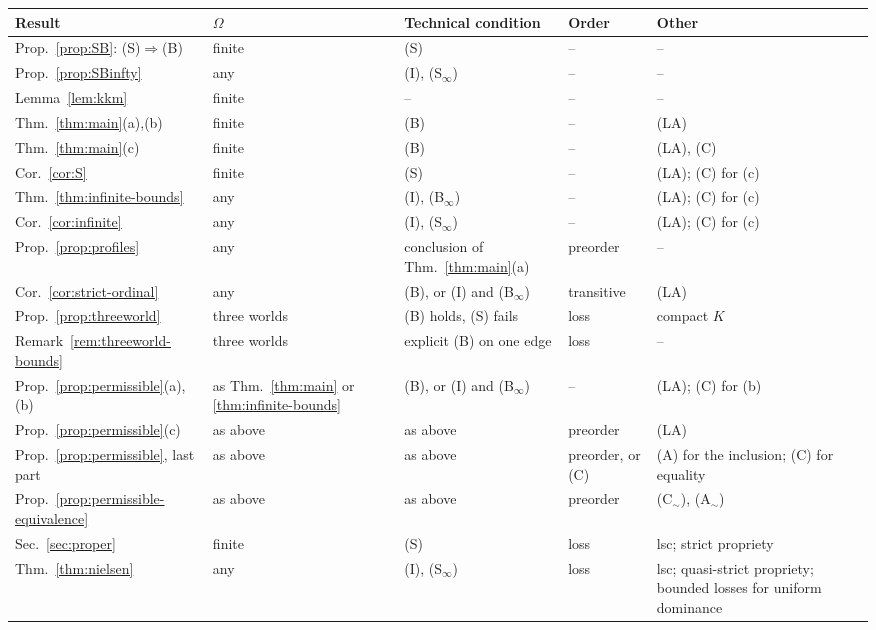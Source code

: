 \documentclass[11pt]{article}
\theoremstyle{definition}
\theoremstyle{remark}
\begin{document}
\begingroup\small
\begin{longtable}{>{\raggedright\arraybackslash}p{}>{\raggedright\arraybackslash}p{}>{\raggedright\arraybackslash}p{}>{\raggedright\arraybackslash}p{}>{\raggedright\arraybackslash}p{}}
\toprule
Result & $\Omega$ & Technical condition & Order & Other\\
\midrule\endhead
\bottomrule\endfoot
Prop.~\ref{prop:SB}: (S)$\Rightarrow$(B) & finite & (S) & -- & --\\
Prop.~\ref{prop:SBinfty} & any & (I), (S$_\infty$) & -- & --\\
Lemma~\ref{lem:kkm} & finite & -- & -- & --\\
Thm.~\ref{thm:main}(a),(b) & finite & (B) & -- & (LA)\\
Thm.~\ref{thm:main}(c) & finite & (B) & -- & (LA), (C)\\
Cor.~\ref{cor:S} & finite & (S) & -- & (LA); (C) for (c)\\
Thm.~\ref{thm:infinite-bounds} & any & (I), (B$_\infty$) & -- & (LA); (C) for (c)\\
Cor.~\ref{cor:infinite} & any & (I), (S$_\infty$) & -- & (LA); (C) for (c)\\
Prop.~\ref{prop:profiles} & any & conclusion of Thm.~\ref{thm:main}(a) & preorder & --\\
Cor.~\ref{cor:strict-ordinal} & any & (B), or (I) and (B$_\infty$) & transitive & (LA)\\
Prop.~\ref{prop:threeworld} & three worlds & (B) holds, (S) fails & loss & compact $K$\\
Remark~\ref{rem:threeworld-bounds} & three worlds & explicit (B) on one edge & loss & --\\
Prop.~\ref{prop:permissible}(a),(b) & as Thm.~\ref{thm:main} or \ref{thm:infinite-bounds} & (B), or (I) and (B$_\infty$) & -- & (LA); (C) for (b)\\
Prop.~\ref{prop:permissible}(c) & as above & as above & preorder & (LA)\\
Prop.~\ref{prop:permissible}, last part & as above & as above & preorder, or (C) & (A) for the inclusion; (C) for equality\\
Prop.~\ref{prop:permissible-equivalence} & as above & as above & preorder & (C$_\sim$), (A$_\sim$)\\
Sec.~\ref{sec:proper} & finite & (S) & loss & lsc; strict propriety\\
Thm.~\ref{thm:nielsen} & any & (I), (S$_\infty$) & loss & lsc; quasi-strict propriety; bounded losses for uniform dominance\\

\end{longtable}
\end{document}
